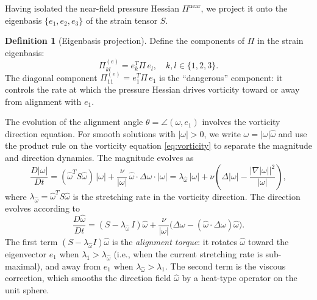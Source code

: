 \documentclass[11pt]{article}
\theoremstyle{definition}
\newtheorem{definition}[theorem]{Definition}
\theoremstyle{remark}
\begin{document}
Having isolated the near-field pressure Hessian $\Pi^{\mathrm{near}}$, we project
it onto the eigenbasis $\{e_1, e_2, e_3\}$ of the strain tensor $S$.

\begin{definition}[Eigenbasis projection]
Define the components of $\Pi$ in the strain eigenbasis:
\begin{equation}\label{eq:Pi-components}
  \Pi_{kl}^{(e)} = e_k^T \Pi\, e_l, \quad k,l \in \{1,2,3\}.
\end{equation}
The diagonal component $\Pi_{11}^{(e)} = e_1^T\Pi\, e_1$ is the ``dangerous''
component: it controls the rate at which the pressure Hessian drives vorticity
toward or away from alignment with $e_1$.
\end{definition}

The evolution of the alignment angle $\theta = \angle(\omega, e_1)$ involves the
vorticity direction equation.  For smooth solutions with $|\omega| > 0$, we
write $\omega = |\omega|\hat\omega$ and use the product rule on the vorticity
equation \eqref{eq:vorticity} to separate the magnitude and direction dynamics.
The magnitude evolves as
\begin{equation}\label{eq:magnitude-evolution}
  \frac{D|\omega|}{Dt} = (\hat\omega^T S\hat\omega)\,|\omega|
  + \frac{\nu}{|\omega|}\,\hat\omega\cdot\Delta\omega\cdot|\omega|
  = \lambda_{\hat\omega}\,|\omega| + \nu\left(\Delta|\omega|
  - \frac{|\nabla|\omega||^2}{|\omega|}\right),
\end{equation}
where $\lambda_{\hat\omega} = \hat\omega^T S\hat\omega$ is the stretching rate in
the vorticity direction.  The direction evolves according to
\begin{equation}\label{eq:direction-evolution}
  \frac{D\hat\omega}{Dt} = (S - \lambda_{\hat\omega}\, I)\hat\omega
  + \frac{\nu}{|\omega|}\bigl(\Delta\omega
  - (\hat\omega\cdot\Delta\omega)\hat\omega\bigr).
\end{equation}
The first term $(S - \lambda_{\hat\omega} I)\hat\omega$ is the \emph{alignment
torque}: it rotates $\hat\omega$ toward the eigenvector $e_1$ when
$\lambda_1 > \lambda_{\hat\omega}$ (i.e., when the current stretching rate is
sub-maximal), and away from $e_1$ when $\lambda_{\hat\omega} > \lambda_1$.
The second term is the viscous correction, which smooths the direction field
$\hat\omega$ by a heat-type operator on the unit sphere.
\end{document}
